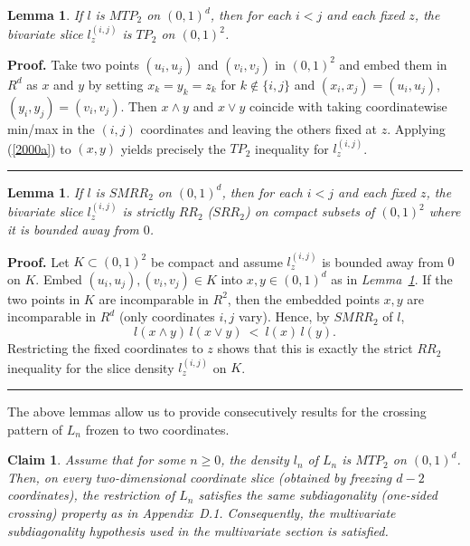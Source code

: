 \documentclass[onecolumn]{article}
\newtheorem{claim}[theorem]{Claim}
\newtheorem{lemma}[theorem]{Lemma}
\newenvironment{proof}[1][Proof]{\noindent\textbf{#1.} }{\ \rule{0.5em}{0.5em}}
\begin{document}
\begin{lemma}
\label{Dd-slice-TP} If $l$ is $MTP_{2}$ on $(0,1)^{d}$, then for each $i<j$
and each fixed $z$, the bivariate slice $l_{z}^{(i,j)}$ is $TP_{2}$ on $%
(0,1)^{2}$.
\end{lemma}

\begin{proof}
\medskip Take two points $(u_{i},u_{j})$ and $(v_{i},v_{j})$ in $(0,1)^{2}$
and embed them in $R^{d}$ as $x$ and $y$ by setting $x_{k}=y_{k}=z_{k}$ for $%
k\notin \{i,j\}$ and $(x_{i},x_{j})=(u_{i},u_{j})$, $%
(y_{i},y_{j})=(v_{i},v_{j})$. Then $x\wedge y$ and $x\vee y$ coincide with
taking coordinatewise min/max in the $(i,j)$ coordinates and leaving the
others fixed at $z$. Applying (\ref{2000a}) to $(x,y)$ yields precisely the $%
TP_{2}$ inequality for $l_{z}^{(i,j)}$. \medskip
\end{proof}

\begin{lemma}
\label{Dd-slice-SRR} If $l$ is $SMRR_{2}$ on $(0,1)^{d}$, then for each $i<j$
and each fixed $z$, the bivariate slice $l_{z}^{(i,j)}$ is strictly $RR_{2}$
($SRR_{2}$) on compact subsets of $(0,1)^{2}$ where it is bounded away from $%
0$.
\end{lemma}

\begin{proof}
\medskip Let $K\subset (0,1)^{2}$ be compact and assume $l_{z}^{(i,j)}$ is
bounded away from $0$ on $K$. Embed $(u_{i},u_{j}),(v_{i},v_{j})\in K$ into $%
x,y\in (0,1)^{d}$ as in \textit{Lemma~\ref{Dd-slice-TP}}. If the two points
in $K$ are incomparable in $R^{2}$, then the embedded points $x,y$ are
incomparable in $R^{d}$ (only coordinates $i,j$ vary). Hence, by $SMRR_{2}$
of $l$, 
\begin{equation}
l(x\wedge y)\,l(x\vee y)\ <\ l(x)\,l(y).  \label{2011}
\end{equation}%
Restricting the fixed coordinates to $z$ shows that this is exactly the
strict $RR_{2}$ inequality for the slice density $l_{z}^{(i,j)}$ on $K$.
\medskip
\end{proof}

The above lemmas allow us to provide consecutively results for the crossing
pattern of $L_{n}$ frozen to two coordinates.

\begin{claim}
\label{Dd-subdiag} Assume that for some $n\geq 0$, the density $l_{n}$ of $%
L_{n}$ is $MTP_{2}$ on $(0,1)^{d}$. Then, on every two-dimensional
coordinate slice (obtained by freezing $d-2$ coordinates), the restriction
of $L_{n}$ satisfies the same subdiagonality (one-sided crossing) property
as in Appendix~D.1. Consequently, the multivariate subdiagonality hypothesis
used in the multivariate section is satisfied.
\end{claim}
\end{document}
